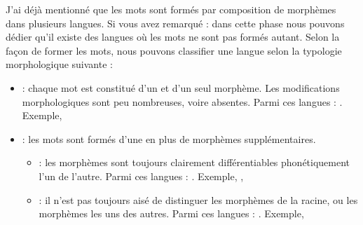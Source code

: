 \documentclass{KodeBook}
\begin{document}
J'ai déjà mentionné que les mots sont formés par composition de morphèmes dans plusieurs langues. 
Si vous avez remarqué : dans cette phase nous pouvons dédier qu'il existe des langues où les mots ne sont pas formés autant. 
Selon la façon de former les mots, nous pouvons classifier une langue selon la typologie morphologique suivante :
\begin{itemize}
	\item {} : chaque mot est constitué d'un et d'un seul morphème. 
	Les modifications morphologiques sont peu nombreuses, voire absentes. 
	Parmi ces langues : . 
	Exemple, 
	
	\item {} : les mots sont formés d'une  en plus de morphèmes supplémentaires.
	\begin{itemize}
		\item {} : les morphèmes sont toujours clairement différentiables phonétiquement l'un de l'autre. 
		Parmi ces langues : . 
		Exemple, , 
		
		\item {} : il n'est pas toujours aisé de distinguer les morphèmes de la racine, ou les morphèmes les uns des autres. 
		Parmi ces langues : .
		Exemple, 
	\end{itemize}
\end{itemize}
\end{document}
